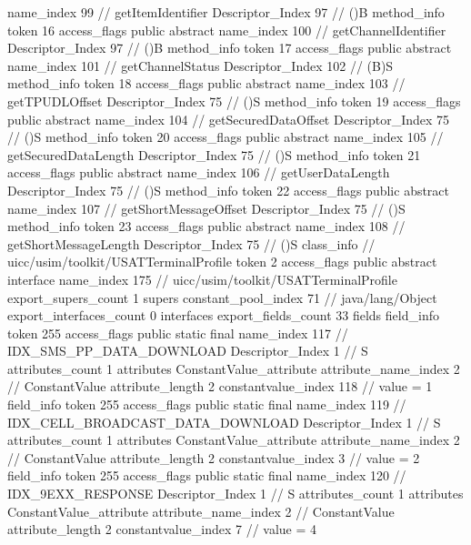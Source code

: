 {{{{{					name_index	99		// getItemIdentifier
					Descriptor_Index	97		// ()B
				}
				method_info {
					token	16
					access_flags	public abstract
					name_index	100		// getChannelIdentifier
					Descriptor_Index	97		// ()B
				}
				method_info {
					token	17
					access_flags	public abstract
					name_index	101		// getChannelStatus
					Descriptor_Index	102		// (B)S
				}
				method_info {
					token	18
					access_flags	public abstract
					name_index	103		// getTPUDLOffset
					Descriptor_Index	75		// ()S
				}
				method_info {
					token	19
					access_flags	public abstract
					name_index	104		// getSecuredDataOffset
					Descriptor_Index	75		// ()S
				}
				method_info {
					token	20
					access_flags	public abstract
					name_index	105		// getSecuredDataLength
					Descriptor_Index	75		// ()S
				}
				method_info {
					token	21
					access_flags	public abstract
					name_index	106		// getUserDataLength
					Descriptor_Index	75		// ()S
				}
				method_info {
					token	22
					access_flags	public abstract
					name_index	107		// getShortMessageOffset
					Descriptor_Index	75		// ()S
				}
				method_info {
					token	23
					access_flags	public abstract
					name_index	108		// getShortMessageLength
					Descriptor_Index	75		// ()S
				}
			}
		}
		class_info {		// uicc/usim/toolkit/USATTerminalProfile
			token	2
			access_flags	public abstract interface
			name_index	175		// uicc/usim/toolkit/USATTerminalProfile
			export_supers_count	1
			supers {
				constant_pool_index	71		// java/lang/Object
			}
			export_interfaces_count	0
			interfaces {
			}
			export_fields_count	33
			fields {
			field_info {
				token	255
				access_flags	public static final
				name_index	117		// IDX_SMS_PP_DATA_DOWNLOAD
				Descriptor_Index	1		// S
				attributes_count	1
				attributes {
				ConstantValue_attribute {
					attribute_name_index	2		// ConstantValue
					attribute_length	2
					constantvalue_index	118		// value = 1
				}
				}
			}
			field_info {
				token	255
				access_flags	public static final
				name_index	119		// IDX_CELL_BROADCAST_DATA_DOWNLOAD
				Descriptor_Index	1		// S
				attributes_count	1
				attributes {
				ConstantValue_attribute {
					attribute_name_index	2		// ConstantValue
					attribute_length	2
					constantvalue_index	3		// value = 2
				}
				}
			}
			field_info {
				token	255
				access_flags	public static final
				name_index	120		// IDX_9EXX_RESPONSE
				Descriptor_Index	1		// S
				attributes_count	1
				attributes {
				ConstantValue_attribute {
					attribute_name_index	2		// ConstantValue
					attribute_length	2
					constantvalue_index	7		// value = 4
}}}}}}}
